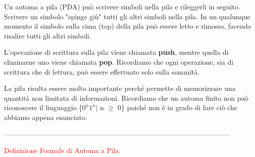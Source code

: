 \documentclass{article}
\begin{document}
\begin{center}

\end{center}

Un automa a pila (PDA) può scrivere simboli nella pila e rileggerli in seguito.
Scrivere un simbolo "spinge giù" tutti gli altri simboli nella pila. In un
qualunque momento il simbolo sulla cima (top) della pila può essere letto e
rimosso, facendo risalire tutti gli altri simboli. 

L'operazione di scrittura sulla pila viene chiamata \textbf{push}, mentre quella
di eliminarne uno viene chiamata \textbf{pop}. Ricordiamo che ogni operazione,
sia di scrittura che di lettura, può essere effettuato solo sulla sommità.

La pila risulta essere molto importante perché permette di memorizzare una
quantità non limitata di informazioni. Ricordiamo che un automa finito non può
riconoscere il linguaggio \{$0^n1^n | $ n $\geq$ 0\} poiché non è in grado di
fare ciò che abbiamo appena enunciato.

--------------------------------------------------------------------------------------------------

\begin{center}
    \textcolor{red}{Definizione Formale di Automa a Pila}
\end{center}
\end{document}
